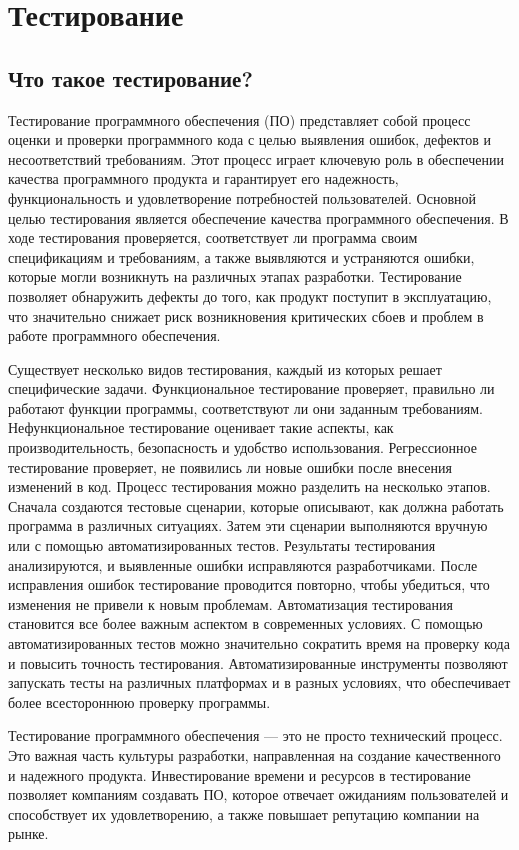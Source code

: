 \chapter{Тестирование}
\label{ch:testing}

    \section{Что такое тестирование?}
    Тестирование программного обеспечения (ПО) представляет собой процесс оценки и проверки программного кода с целью выявления ошибок, дефектов и несоответствий требованиям. Этот процесс играет ключевую роль в обеспечении качества программного продукта и гарантирует его надежность, функциональность и удовлетворение потребностей пользователей. Основной целью тестирования является обеспечение качества программного обеспечения. В ходе тестирования проверяется, соответствует ли программа своим спецификациям и требованиям, а также выявляются и устраняются ошибки, которые могли возникнуть на различных этапах разработки. Тестирование позволяет обнаружить дефекты до того, как продукт поступит в эксплуатацию, что значительно снижает риск возникновения критических сбоев и проблем в работе программного обеспечения. 

    Существует несколько видов тестирования, каждый из которых решает специфические задачи. Функциональное тестирование проверяет, правильно ли работают функции программы, соответствуют ли они заданным требованиям. Нефункциональное тестирование оценивает такие аспекты, как производительность, безопасность и удобство использования. Регрессионное тестирование проверяет, не появились ли новые ошибки после внесения изменений в код. Процесс тестирования можно разделить на несколько этапов. Сначала создаются тестовые сценарии, которые описывают, как должна работать программа в различных ситуациях. Затем эти сценарии выполняются вручную или с помощью автоматизированных тестов. Результаты тестирования анализируются, и выявленные ошибки исправляются разработчиками. После исправления ошибок тестирование проводится повторно, чтобы убедиться, что изменения не привели к новым проблемам. Автоматизация тестирования становится все более важным аспектом в современных условиях. С помощью автоматизированных тестов можно значительно сократить время на проверку кода и повысить точность тестирования. Автоматизированные инструменты позволяют запускать тесты на различных платформах и в разных условиях, что обеспечивает более всестороннюю проверку программы. 

    Тестирование программного обеспечения — это не просто технический процесс. Это важная часть культуры разработки, направленная на создание качественного и надежного продукта. Инвестирование времени и ресурсов в тестирование позволяет компаниям создавать ПО, которое отвечает ожиданиям пользователей и способствует их удовлетворению, а также повышает репутацию компании на рынке. 

